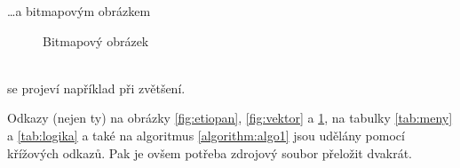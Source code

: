 \documentclass[a4paper, 11pt]{article}
\begin{document}
\dots a bitmapovým obrázkem
\begin{figure}[h]
    \centering
    \caption{Bitmapový obrázek}
    \label{fig:bitmap}
\end{figure}\\[1em]
\noindent se projeví například při zvětšení.

Odkazy (nejen ty) na obrázky \ref{fig:etiopan}, \ref{fig:vektor} a \ref{fig:bitmap}, na 
tabulky \ref{tab:meny} a \ref{tab:logika} a také na algoritmus \ref{algorithm:algo1} jsou udělány pomocí 
křížových odkazů. Pak je ovšem potřeba zdrojový soubor přeložit dvakrát.
\end{document}
